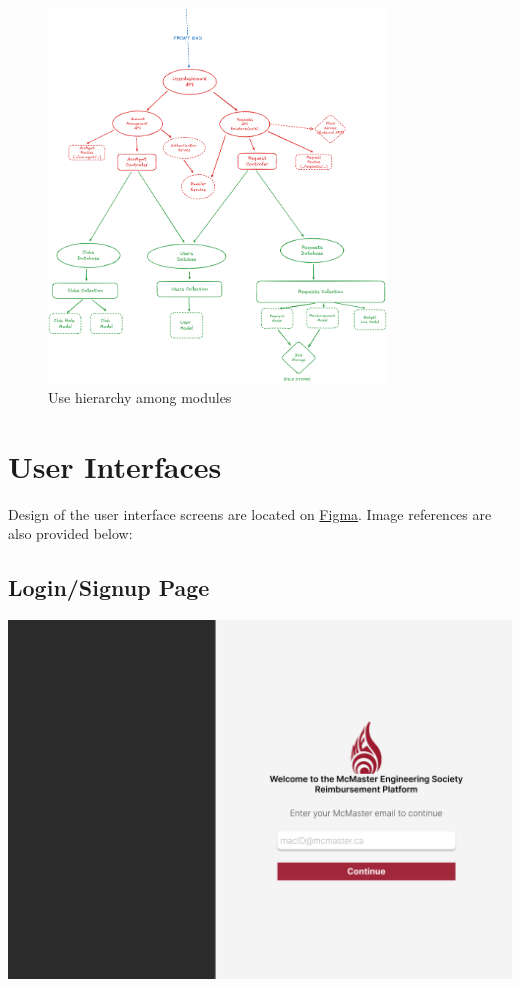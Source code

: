 \documentclass[12pt, titlepage]{article}
\begin{document}
\begin{figure}[H]
\centering
\includegraphics[width=0.8\textwidth]{imgs/UsesHierarchy.png}
\caption{Use hierarchy among modules}
\label{FigUH}
\end{figure}


\newpage

\section{User Interfaces}

Design of the user interface screens are located on \href{https://www.figma.com/design/44vRz90xLocsOkyLXjaODB/MES-Finance-Platform?node-id=0-1&t=uPGJjQawfH5iIdCy-1}{Figma}. Image references are also provided below:

\subsection{Login/Signup Page}
\includegraphics[]{imgs/LoginSignupPage.png}
\end{document}
